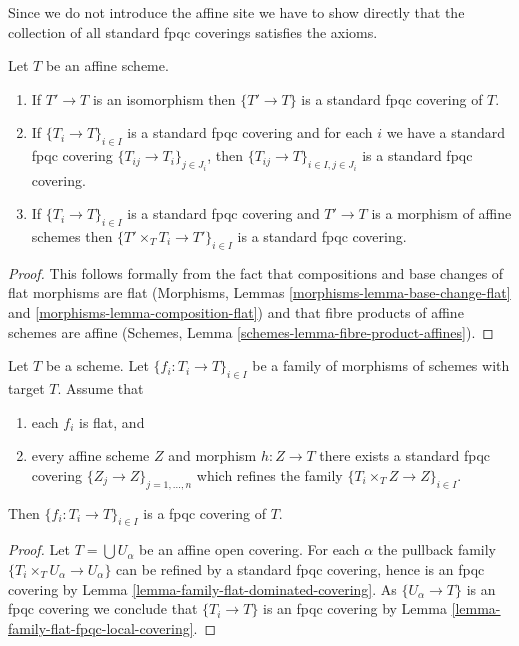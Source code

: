 \noindent
Since we do not introduce the affine site we have to show directly
that the collection of all standard fpqc coverings satisfies the
axioms.

\begin{lemma}
\label{lemma-fpqc-affine-axioms}
Let $T$ be an affine scheme.
\begin{enumerate}
\item If $T' \to T$ is an isomorphism then $\{T' \to T\}$
is a standard fpqc covering of $T$.
\item If $\{T_i \to T\}_{i\in I}$ is a standard fpqc covering and for each
$i$ we have a standard fpqc covering $\{T_{ij} \to T_i\}_{j\in J_i}$, then
$\{T_{ij} \to T\}_{i \in I, j\in J_i}$ is a standard fpqc covering.
\item If $\{T_i \to T\}_{i\in I}$ is a standard fpqc covering
and $T' \to T$ is a morphism of affine schemes then
$\{T' \times_T T_i \to T'\}_{i\in I}$ is a standard fpqc covering.
\end{enumerate}
\end{lemma}

\begin{proof}
This follows formally from the fact that compositions and base changes
of flat morphisms are flat
(Morphisms, Lemmas \ref{morphisms-lemma-base-change-flat} and
\ref{morphisms-lemma-composition-flat})
and that fibre products of affine schemes are affine
(Schemes, Lemma \ref{schemes-lemma-fibre-product-affines}).
\end{proof}

\begin{lemma}
\label{lemma-fpqc-covering-affines-mapping-in}
Let $T$ be a scheme. Let $\{f_i : T_i \to T\}_{i \in I}$ be a family of
morphisms of schemes with target $T$. Assume that
\begin{enumerate}
\item each $f_i$ is flat, and
\item every affine scheme
$Z$ and morphism $h : Z \to T$ there exists a standard fpqc covering
$\{Z_j \to Z\}_{j = 1, \ldots, n}$ which refines the family
$\{T_i \times_T Z \to Z\}_{i \in I}$.
\end{enumerate}
Then $\{f_i : T_i \to T\}_{i \in I}$ is a fpqc covering of $T$.
\end{lemma}

\begin{proof}
Let $T = \bigcup U_\alpha$ be an affine open covering.
For each $\alpha$ the pullback family $\{T_i \times_T U_\alpha \to U_\alpha\}$
can be refined by a standard fpqc covering, hence is an
fpqc covering by Lemma
\ref{lemma-family-flat-dominated-covering}.
As $\{U_\alpha \to T\}$ is an fpqc covering we conclude that
$\{T_i \to T\}$ is an fpqc covering by
Lemma \ref{lemma-family-flat-fpqc-local-covering}.
\end{proof}


